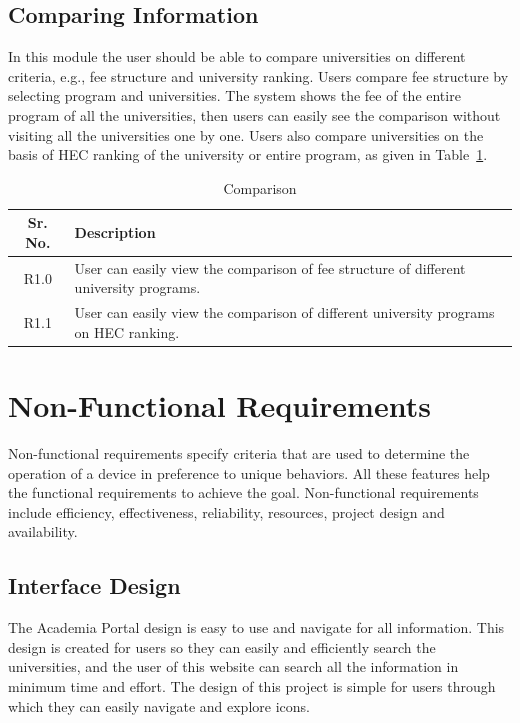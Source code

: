 \subsection{Comparing Information}

In this module the user should be able to compare universities on different criteria, e.g., fee structure and university ranking. Users compare fee structure by selecting program and universities. The system shows the fee of the entire program of all the universities, then users can easily see the comparison without visiting all the universities one by one. Users also compare universities on the basis of HEC ranking of the university or entire program, as given in Table~\ref{tab:comparison_req}.

\begin{table}[H]
\centering
\caption{Comparison}
\label{tab:comparison_req}
\begin{tabularx}{\textwidth}{|c|X|}
\hline
\textbf{Sr. No.} & \textbf{Description} \\
\hline
R1.0 & User can easily view the comparison of fee structure of different university programs. \\
\hline
R1.1 & User can easily view the comparison of different university programs on HEC ranking. \\
\hline
\end{tabularx}
\end{table}

\section{Non-Functional Requirements}

Non-functional requirements specify criteria that are used to determine the operation of a device in preference to unique behaviors. All these features help the functional requirements to achieve the goal. Non-functional requirements include efficiency, effectiveness, reliability, resources, project design and availability.

\subsection{Interface Design}

The Academia Portal design is easy to use and navigate for all information. This design is created for users so they can easily and efficiently search the universities, and the user of this website can search all the information in minimum time and effort. The design of this project is simple for users through which they can easily navigate and explore icons.

